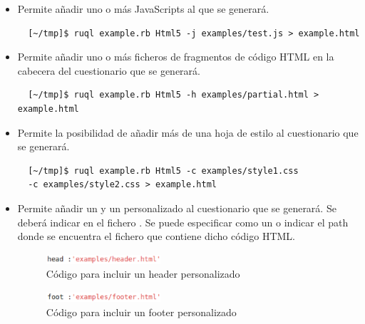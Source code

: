\begin{itemize}
  \item Permite a\~{n}adir uno o m\'as JavaScripts al  que se generar\'a.
  \begin{verbatim}
  [~/tmp]$ ruql example.rb Html5 -j examples/test.js > example.html
  \end{verbatim}
  
  \item Permite a\~{n}adir uno o m\'as ficheros de fragmentos de c\'odigo HTML en la cabecera 
  del cuestionario que se generar\'a.
  \begin{verbatim}
  [~/tmp]$ ruql example.rb Html5 -h examples/partial.html > example.html
  \end{verbatim}
  
  \item Permite la posibilidad de a\~{n}adir m\'as de una hoja de estilo  al cuestionario que se generar\'a.
  \begin{verbatim}
  [~/tmp]$ ruql example.rb Html5 -c examples/style1.css 
  -c examples/style2.css > example.html
  \end{verbatim}
  
  \item Permite a\~{n}adir un \ceit{\ref{apend1:header}} y un \ceit{\ref{apend1:footer}} personalizado al cuestionario que se generar\'a. Se deber\'a indicar
  en el fichero . Se puede especificar como un  o indicar el path donde se encuentra el fichero que contiene 
  dicho c\'odigo HTML.
  
  \begin{figure}[!th]
  \begin{center}
  \includegraphics[width=0.4\textwidth]{images/header.eps}
  \caption{C\'odigo para incluir un header personalizado}
  \label{fig:header}
  \end{center}
  \end{figure}
  
  \begin{figure}[!th]
  \begin{center}
  \includegraphics[width=0.4\textwidth]{images/footer.eps}
  \caption{C\'odigo para incluir un footer personalizado}
  \label{fig:footer}
  \end{center}
  \end{figure}


\end{itemize}
